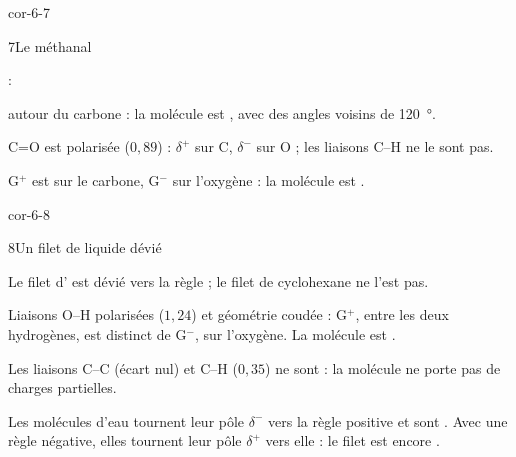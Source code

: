 \begin{blocLivre}{cor-6-7}
\begin{corrige}{7}{Le méthanal}
\begin{questions}
\item {} : 
\item {} autour du carbone : la molécule est , avec des angles voisins de \qty{120}{\degree}.
\item C=O est polarisée ($0{,}89$) : $\delta^{+}$ sur C, $\delta^{-}$ sur O ; les liaisons C--H ne le sont pas.
\item G$^{+}$ est sur le carbone, G$^{-}$ sur l'oxygène : la molécule est .
\end{questions}
\end{corrige}
\end{blocLivre}
\begin{blocLivre}{cor-6-8}
\begin{corrige}{8}{Un filet de liquide dévié}
\begin{questions}
\item Le filet d' est dévié vers la règle ; le filet de cyclohexane ne l'est pas.
\item Liaisons O--H polarisées ($1{,}24$) et géométrie coudée : G$^{+}$, entre les deux hydrogènes, est distinct de G$^{-}$, sur
l'oxygène. La molécule est .
\item Les liaisons C--C (écart nul) et C--H ($0{,}35$) ne sont  : la molécule ne porte pas de charges
partielles.
\item Les molécules d'eau tournent leur pôle $\delta^{-}$ vers la règle positive et sont . Avec une règle négative,
elles tournent leur pôle $\delta^{+}$ vers elle : le filet est encore .
\end{questions}
\end{corrige}
\end{blocLivre}
